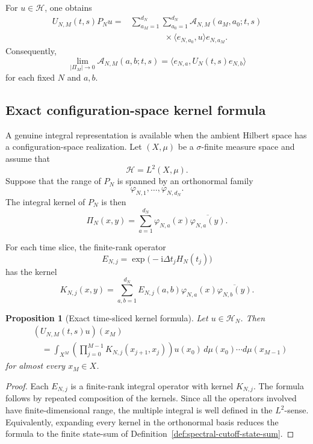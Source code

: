 \documentclass[10pt,a4paper]{amsart}
\newtheorem{proposition}[theorem]{Proposition}
\begin{document}
For \(u\in\mathcal{H}\), one obtains
\[
\begin{split}
U_{N,M}(t,s)P_{N}u
={}&
\sum_{a_{M}=1}^{d_{N}}
\sum_{a_{0}=1}^{d_{N}}
\mathcal{A}_{N,M}(a_{M},a_{0};t,s)
\\
&\qquad\qquad\times
\langle e_{N,a_{0}},u\rangle e_{N,a_{M}}.
\end{split}
\]
Consequently,
\[
\lim_{|\Pi_{M}|\to 0}
\mathcal{A}_{N,M}(a,b;t,s)
=
\langle e_{N,a},U_{N}(t,s)e_{N,b}\rangle
\]
for each fixed \(N\) and \(a,b\).


\subsection{Exact configuration-space kernel formula}
\label{subsec:configuration-space-kernel}

A genuine integral representation is available when the ambient Hilbert space
has a configuration-space realization. Let \((X,\mu)\) be a
\(\sigma\)-finite measure space and assume that
\[
\mathcal{H}=L^{2}(X,\mu).
\]
Suppose that the range of \(P_{N}\) is spanned by an orthonormal family
\[
\varphi_{N,1},\ldots,\varphi_{N,d_{N}}.
\]
The integral kernel of \(P_{N}\) is then
\[
\Pi_{N}(x,y)
=
\sum_{a=1}^{d_{N}}
\varphi_{N,a}(x)\overline{\varphi_{N,a}(y)}.
\]

For each time slice, the finite-rank operator
\[
E_{N,j}
=
\exp\bigl(-\mathrm{i}\Delta t_{j}H_{N}(t_{j})\bigr)
\]
has the kernel
\[
K_{N,j}(x,y)
=
\sum_{a,b=1}^{d_{N}}
E_{N,j}(a,b)
\varphi_{N,a}(x)\overline{\varphi_{N,b}(y)}.
\]

\begin{proposition}[Exact time-sliced kernel formula]
\label{prop:exact-time-sliced-kernel}
Let \(u\in\mathcal{H}_{N}\). Then
\[
\begin{split}
&(U_{N,M}(t,s)u)(x_{M})
\\
&\quad=
\int_{X^{M}}
\left(
\prod_{j=0}^{M-1}
K_{N,j}(x_{j+1},x_{j})
\right)
u(x_{0})\,
d\mu(x_{0})\cdots d\mu(x_{M-1})
\end{split}
\]
for almost every \(x_{M}\in X\).
\end{proposition}

\begin{proof}
Each \(E_{N,j}\) is a finite-rank integral operator with kernel \(K_{N,j}\).
The formula follows by repeated composition of the kernels. Since all the
operators involved have finite-dimensional range, the multiple integral is
well defined in the \(L^{2}\)-sense. Equivalently, expanding every kernel in
the orthonormal basis reduces the formula to the finite state-sum of
Definition~\ref{def:spectral-cutoff-state-sum}.
\end{proof}
\end{document}
